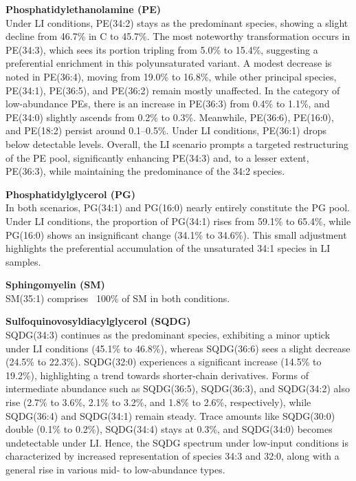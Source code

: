 \documentclass[10pt,letterpaper]{article}
\begin{document}
\textbf{Phosphatidylethanolamine (PE)}  \\
Under LI conditions, PE(34:2) stays as the predominant species, showing a slight decline from 46.7\% in C to 45.7\%. The most noteworthy transformation occurs in PE(34:3), which sees its portion tripling from 5.0\% to 15.4\%, suggesting a preferential enrichment in this polyunsaturated variant. A modest decrease is noted in PE(36:4), moving from 19.0\% to 16.8\%, while other principal species, PE(34:1), PE(36:5), and PE(36:2) remain mostly unaffected. In the category of low-abundance PEs, there is an increase in PE(36:3) from 0.4\% to 1.1\%, and PE(34:0) slightly ascends from 0.2\% to 0.3\%. Meanwhile, PE(36:6), PE(16:0), and PE(18:2) persist around 0.1–0.5\%. Under LI conditions, PE(36:1) drops below detectable levels. Overall, the LI scenario prompts a targeted restructuring of the PE pool, significantly enhancing PE(34:3) and, to a lesser extent, PE(36:3), while maintaining the predominance of the 34:2 species.

\textbf{Phosphatidylglycerol (PG)}  \\
In both scenarios, PG(34:1) and PG(16:0) nearly entirely constitute the PG pool. Under LI conditions, the proportion of PG(34:1) rises from 59.1\% to 65.4\%, while PG(16:0) shows an insignificant change (34.1\% to 34.6\%). This small adjustment highlights the preferential accumulation of the unsaturated 34:1 species in LI samples.

\textbf{Sphingomyelin (SM)}  \\
SM(35:1) comprises ~100\% of SM in both conditions.

\textbf{Sulfoquinovosyldiacylglycerol (SQDG)}  \\
SQDG(34:3) continues as the predominant species, exhibiting a minor uptick under LI conditions (45.1\% to 46.8\%), whereas SQDG(36:6) sees a slight decrease (24.5\% to 22.3\%). SQDG(32:0) experiences a significant increase (14.5\% to 19.2\%), highlighting a trend towards shorter-chain derivatives. Forms of intermediate abundance such as SQDG(36:5), SQDG(36:3), and SQDG(34:2) also rise (2.7\% to 3.6\%, 2.1\% to 3.2\%, and 1.8\% to 2.6\%, respectively), while SQDG(36:4) and SQDG(34:1) remain steady. Trace amounts like SQDG(30:0) double (0.1\% to 0.2\%), SQDG(34:4) stays at 0.3\%, and SQDG(34:0) becomes undetectable under LI. Hence, the SQDG spectrum under low-input conditions is characterized by increased representation of species 34:3 and 32:0, along with a general rise in various mid- to low-abundance types.
\end{document}
